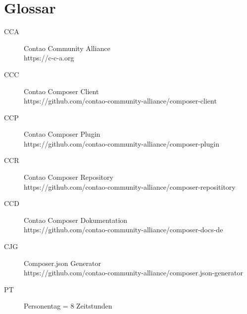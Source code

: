 \documentclass[
paper=a4,
draft=false,%
fontsize=10pt%
]{scrartcl}
\begin{document}
\newpage

\section{Glossar}

\begin{description}
\item[CCA] Contao Community Alliance \\
https://c-c-a.org
\item[CCC] Contao Composer Client \\
https://github.com/contao-community-alliance/composer-client
\item[CCP] Contao Composer Plugin \\
https://github.com/contao-community-alliance/composer-plugin
\item[CCR] Contao Composer Repository \\
https://github.com/contao-community-alliance/composer-reposititory
\item[CCD] Contao Composer Dokumentation \\
https://github.com/contao-community-alliance/composer-docs-de
\item[CJG] Composer.json Generator \\
https://github.com/contao-community-alliance/composer.json-generator
\item[PT] Personentag = 8 Zeitstunden
\end{description}
\end{document}
